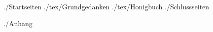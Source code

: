 \documentclass[12pt,a4paper]{scrartcl}
\begin{document}
 {./Startseiten}
 {./tex/Grundgedanken}
 {./tex/Honigbuch}
 {./Schlussseiten}


 {./Anhang}
\end{document}
